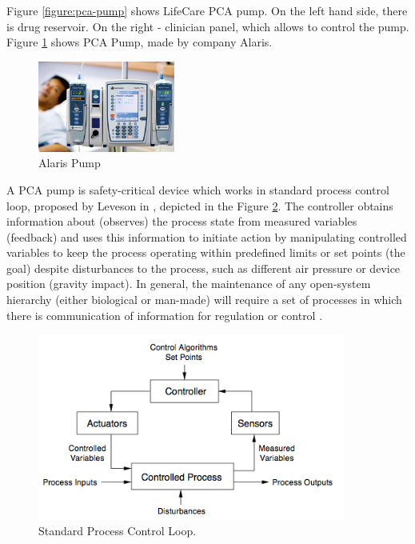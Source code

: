 Figure \ref{figure:pca-pump} shows LifeCare PCA pump. On the left hand side, there is drug reservoir. On the right -  clinician panel, which allows to control the pump. Figure \ref{figure:alaris-pump} shows PCA Pump, made by company Alaris. 

\begin{figure}
  \begin{center}
    \includegraphics[width=0.4\textwidth]{figures/alaris-pump.png}
  \end{center}
  \caption{Alaris Pump}
  \label{figure:alaris-pump}
\end{figure}

A PCA pump is safety-critical device which works in standard process control loop, proposed by Leveson in \cite{SaferWorld}, depicted in the Figure \ref{figure:control-loop}. The controller obtains information about (observes) the process state from measured variables (feedback) and uses this information to initiate action by manipulating controlled variables to keep the process operating within predefined limits or set points (the goal) despite disturbances to the process, such as different air pressure or device position (gravity impact). In general, the maintenance of any open-system hierarchy (either biological or man-made) will require a set of processes in which there is communication of information for regulation or control \cite{SaferWorld}.

\begin{figure}[ht]%
    \begin{center}
    	\includegraphics[width=0.9\textwidth]{figures/safety-critical-loop.png}    	
    \end{center}
    \caption{Standard Process Control Loop.}
    \label{figure:control-loop}
\end{figure}

